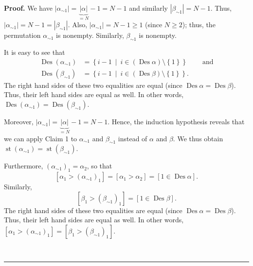 \documentclass[numbers=enddot,12pt,final,onecolumn,notitlepage]{scrartcl}%
\theoremstyle{definition}
\newenvironment{proof}[1][Proof]{\noindent\textbf{#1.} }{\ \rule{0.5em}{0.5em}}
\begin{document}
\begin{proof}
We have $\left\vert \alpha_{\sim1}\right\vert =\underbrace{\left\vert
\alpha\right\vert }_{=N}-1=N-1$ and similarly $\left\vert \beta_{\sim
1}\right\vert =N-1$. Thus, $\left\vert \alpha_{\sim1}\right\vert
=N-1=\left\vert \beta_{\sim1}\right\vert $. Also, $\left\vert \alpha_{\sim
1}\right\vert =N-1\geq1$ (since $N\geq2$); thus, the permutation $\alpha
_{\sim1}$ is nonempty. Similarly, $\beta_{\sim1}$ is nonempty.

It is easy to see that
\begin{align*}
\operatorname*{Des}\left(  \alpha_{\sim1}\right)   &  =\left\{  i-1\ \mid
\ i\in\left(  \operatorname*{Des}\alpha\right)  \setminus\left\{  1\right\}
\right\}  \ \ \ \ \ \ \ \ \ \ \text{and}\\
\operatorname*{Des}\left(  \beta_{\sim1}\right)   &  =\left\{  i-1\ \mid
\ i\in\left(  \operatorname*{Des}\beta\right)  \setminus\left\{  1\right\}
\right\}  .
\end{align*}
The right hand sides of these two equalities are equal (since
$\operatorname*{Des}\alpha=\operatorname*{Des}\beta$). Thus, their left hand
sides are equal as well. In other words, $\operatorname*{Des}\left(
\alpha_{\sim1}\right)  =\operatorname*{Des}\left(  \beta_{\sim1}\right)  $.

Moreover, $\left\vert \alpha_{\sim1}\right\vert =\underbrace{\left\vert
\alpha\right\vert }_{=N}-1=N-1$. Hence, the induction hypothesis reveals that
we can apply Claim 1 to $\alpha_{\sim1}$ and $\beta_{\sim1}$ instead of
$\alpha$ and $\beta$. We thus obtain $\operatorname*{st}\left(  \alpha_{\sim
1}\right)  =\operatorname*{st}\left(  \beta_{\sim1}\right)  $.

Furthermore, $\left(  \alpha_{\sim1}\right)  _{1}=\alpha_{2}$, so that
\[
\left[  \alpha_{1}>\left(  \alpha_{\sim1}\right)  _{1}\right]  =\left[
\alpha_{1}>\alpha_{2}\right]  =\left[  1\in\operatorname*{Des}\alpha\right]
.
\]
Similarly,%
\[
\left[  \beta_{1}>\left(  \beta_{\sim1}\right)  _{1}\right]  =\left[
1\in\operatorname*{Des}\beta\right]  .
\]
The right hand sides of these two equalities are equal (since
$\operatorname*{Des}\alpha=\operatorname*{Des}\beta$). Thus, their left hand
sides are equal as well. In other words, $\left[  \alpha_{1}>\left(
\alpha_{\sim1}\right)  _{1}\right]  =\left[  \beta_{1}>\left(  \beta_{\sim
1}\right)  _{1}\right]  $.


\end{proof}
\end{document}
